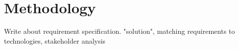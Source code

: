 \section{Methodology}

Write about requirement specification. "solution", matching requirements to technologies, stakeholder analysis
